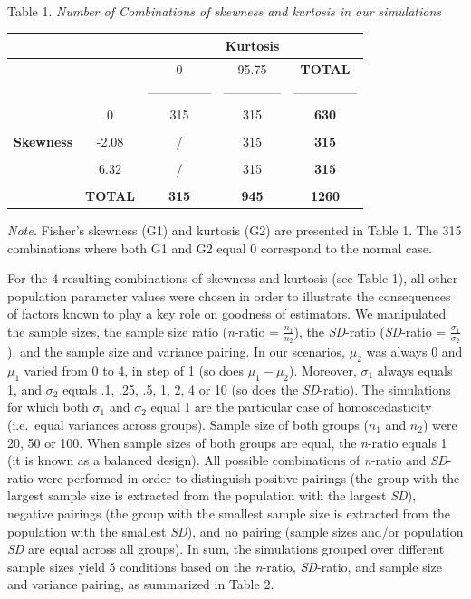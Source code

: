 \documentclass[man]{apa6}
\begin{document}
Table 1.
\emph{Number of Combinations of skewness and kurtosis in our simulations}

\begin{longtable}[]{@{}ccccc@{}}
\toprule
& & & \textbf{Kurtosis} &\tabularnewline
\midrule
\endhead
& & 0 & 95.75 & \textbf{TOTAL}\tabularnewline
& & --------------- & -------------- & ---------------\tabularnewline
& 0 & 315 & 315 & \textbf{630}\tabularnewline
& & & &\tabularnewline
\textbf{Skewness} & -2.08 & / & 315 & \textbf{315}\tabularnewline
& & & &\tabularnewline
& 6.32 & / & 315 & \textbf{315}\tabularnewline
& & & &\tabularnewline
& \textbf{TOTAL} & \textbf{315} & \textbf{945} & \textbf{1260}\tabularnewline
\bottomrule
\end{longtable}

\emph{Note.} Fisher's skewness (G1) and kurtosis (G2) are presented in Table 1. The 315 combinations where both G1 and G2 equal 0 correspond to the normal case.

For the 4 resulting combinations of skewness and kurtosis (see Table 1), all other population parameter values were chosen in order to illustrate the consequences of factors known to play a key role on goodness of estimators. We manipulated the sample sizes, the sample size ratio (\emph{n}-ratio = \(\frac{n_1}{n_2}\)), the \emph{SD}-ratio (\emph{SD}-ratio = \(\frac{\sigma_1}{\sigma_2}\)), and the sample size and variance pairing. In our scenarios, \(\mu_2\) was always 0 and \(\mu_1\) varied from 0 to 4, in step of 1 (so does \(\mu_1-\mu_2\)). Moreover, \(\sigma_1\) always equals 1, and \(\sigma_2\) equals .1, .25, .5, 1, 2, 4 or 10 (so does the \emph{SD}-ratio). The simulations for which both \(\sigma_1\) and \(\sigma_2\) equal 1 are the particular case of homoscedasticity (i.e.~equal variances across groups). Sample size of both groups (\(n_1\) and \(n_2\)) were 20, 50 or 100. When sample sizes of both groups are equal, the \emph{n}-ratio equals 1 (it is known as a balanced design). All possible combinations of \emph{n}-ratio and \emph{SD}-ratio were performed in order to distinguish positive pairings (the group with the largest sample size is extracted from the population with the largest \emph{SD}), negative pairings (the group with the smallest sample size is extracted from the population with the smallest \emph{SD}), and no pairing (sample sizes and/or population \emph{SD} are equal across all groups). In sum, the simulations grouped over different sample sizes yield 5 conditions based on the \emph{n}-ratio, \emph{SD}-ratio, and sample size and variance pairing, as summarized in Table 2.
\end{document}
